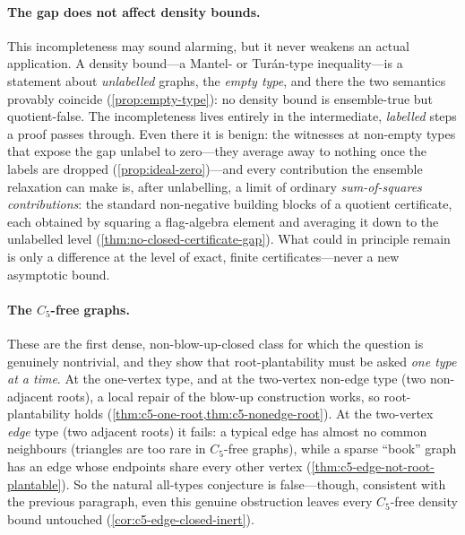 \documentclass[11pt]{article}
\theoremstyle{definition}
\begin{document}
\paragraph{The gap does not affect density bounds.}
This incompleteness may sound alarming, but it never weakens an actual application.  A
density bound---a Mantel- or Tur\'an-type inequality---is a statement about
\emph{unlabelled} graphs, the \emph{empty type}, and there the two semantics provably
coincide (\cref{prop:empty-type}): no density bound is ensemble-true but quotient-false.
The incompleteness lives entirely in the intermediate, \emph{labelled} steps a proof
passes through.  Even there it is benign: the witnesses at non-empty types that expose the gap
unlabel to zero---they average away to nothing once the labels are dropped
(\cref{prop:ideal-zero})---and every contribution the ensemble relaxation can make is,
after unlabelling, a limit of ordinary \emph{sum-of-squares contributions}: the standard
non-negative building blocks of a quotient certificate, each obtained by squaring a
flag-algebra element and averaging it down to the unlabelled level
(\cref{thm:no-closed-certificate-gap}).  What could in principle remain is
only a difference at the level of exact, finite certificates---never a new asymptotic
bound.

\paragraph{The \texorpdfstring{$C_5$}{C5}-free graphs.}
These are the first dense, non-blow-up-closed class for which the question is genuinely
nontrivial, and they show that root-plantability must be asked \emph{one type at a time}.
At the one-vertex type, and at the two-vertex non-edge type (two non-adjacent roots), a local
repair of the blow-up construction works, so root-plantability holds
(\cref{thm:c5-one-root,thm:c5-nonedge-root}).  At the two-vertex \emph{edge} type (two
adjacent roots) it
fails: a typical edge has almost no common neighbours (triangles are too rare in
$C_5$-free graphs), while a sparse ``book'' graph has an edge whose endpoints share every
other vertex (\cref{thm:c5-edge-not-root-plantable}).  So the natural all-types conjecture
is false---though, consistent with the previous paragraph, even this genuine obstruction
leaves every $C_5$-free density bound untouched (\cref{cor:c5-edge-closed-inert}).
\end{document}
